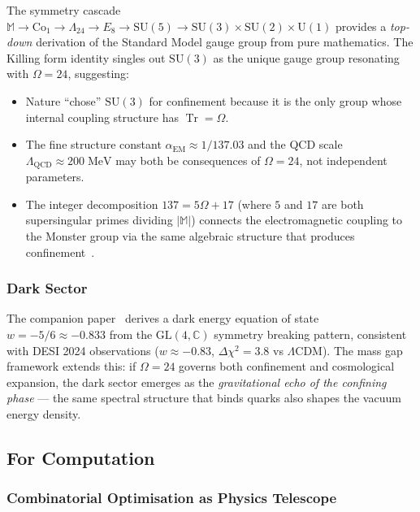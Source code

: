 \documentclass[11pt,a4paper]{article}
\theoremstyle{plain}
\theoremstyle{remark}
\renewcommand{\Omega}{\varOmega}
\newcommand{\CC}{\mathbb{C}}
\newcommand{\Tr}{\operatorname{Tr}}
\newcommand{\SU}{\mathrm{SU}}
\newcommand{\aEM}{\alpha_{\mathrm{EM}}}
\begin{document}
The symmetry cascade
$\mathbb{M} \to \mathrm{Co}_1 \to \Lambda_{24} \to E_8 \to \SU(5)
\to \SU(3) \times \SU(2) \times \mathrm{U}(1)$
provides a \emph{top-down} derivation of the Standard Model gauge group
from pure mathematics.  The Killing form identity singles out $\SU(3)$
as the unique gauge group resonating with $\Omega = 24$, suggesting:
\begin{itemize}[itemsep=2pt]
\item Nature ``chose'' $\SU(3)$ for confinement because it is the only
  group whose internal coupling structure has $\Tr = \Omega$.
\item The fine structure constant $\aEM \approx 1/137.03$ and the QCD
  scale $\Lambda_{\mathrm{QCD}} \approx 200\;\mathrm{MeV}$ may both be
  consequences of $\Omega = 24$, not independent parameters.
\item The integer decomposition $137 = 5\Omega + 17$ (where $5$ and $17$
  are both supersingular primes dividing $|\mathbb{M}|$) connects the
  electromagnetic coupling to the Monster group via the same algebraic
  structure that produces confinement~\cite{DHR2026d}.
\end{itemize}

\subsubsection{Dark Sector}

The companion paper~\cite{DHR2026d} derives a dark energy equation of
state $w = -5/6 \approx -0.833$ from the $\mathrm{GL}(4,\CC)$ symmetry
breaking pattern, consistent with DESI 2024 observations
($w \approx -0.83$, $\Delta\chi^2 = 3.8$ vs $\Lambda$CDM).  The mass gap
framework extends this: if $\Omega = 24$ governs both confinement and
cosmological expansion, the dark sector emerges as the
\emph{gravitational echo of the confining phase} --- the same spectral
structure that binds quarks also shapes the vacuum energy density.

\subsection{For Computation}

\subsubsection{Combinatorial Optimisation as Physics Telescope}
\end{document}
